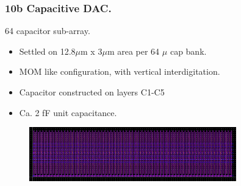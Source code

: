 \documentclass[t, screen, aspectratio=43]{beamer}
\begin{document}
\begin{frame}
	\frametitle{10b Capacitive DAC.}
	\begin{block}{64 capacitor sub-array.}

			\vspace{1em}
			\tiny
			\begin{itemize}[itemsep=4pt,label=\protect---]
			        \item Settled on 12.8$\mu$m x 3$\mu$m area per 64 $\mu$ cap bank.
			        \item MOM like configuration, with vertical interdigitation.
			        \item Capacitor constructed on layers C1-C5
			        \item Ca. 2 fF unit capacitance.
			\end{itemize}

			\begin{figure}[htb!]
			        \centering
			        \includegraphics[width=0.8\textwidth, angle=0]{64cap}
			\end{figure}


	\end{block}	
\end{frame}
\end{document}
